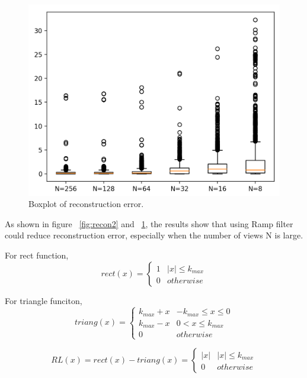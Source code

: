 \documentclass[11pt,a4paper]{article}
\begin{document}
\begin{figure}[!htp]
    \centering
    \includegraphics[width=0.8\linewidth]{HW2_Q3_4.2.png}
    \caption{Boxplot of reconstruction error.}
    \label{fig:boxplot2}
\end{figure}

As shown in figure ~\ref{fig:recon2} and ~\ref{fig:boxplot2}, the results show that using Ramp filter could reduce reconstruction error, especially when the number of views N is large. 

\newpage 
{}
For rect function, \\
\begin{equation}
    rect(x) = 
      \begin{cases}
        1 & |x| \le k_{max}\\
        0 & otherwise
      \end{cases}       
  \end{equation}

For triangle funciton, \\
\begin{equation}
    triang(x) = 
      \begin{cases}
        k_{max}+x & -k_{max}\le x \le 0\\
        k_{max}-x & 0 < x \le k_{max} \\
        0 & otherwise
      \end{cases}       
\end{equation}

\begin{equation}
    RL(x) = rect(x)-triang(x) = 
      \begin{cases}
        |x| & |x| \le k_{max}\\
        0 & otherwise
      \end{cases}       
\end{equation}
\end{document}

